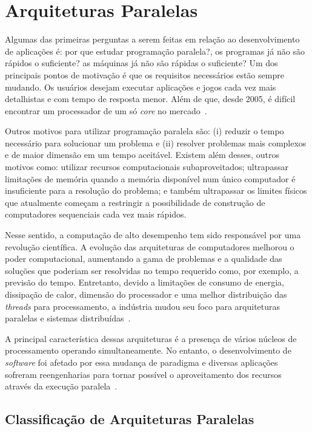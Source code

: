 \section{Arquiteturas Paralelas}\label{sec:arquitetura}

Algumas das primeiras perguntas a serem feitas em relação ao desenvolvimento de aplicações é: por que estudar programação paralela?, os programas já não são rápidos o suficiente? as máquinas já não são rápidas o suficiente? Um dos principais pontos de motivação é que os requisitos necessários estão sempre mudando. Os usuários desejam executar aplicações e jogos cada vez mais detalhistas e com tempo de resposta menor. Além de que, desde 2005, é difícil encontrar um processador de um só \textit{core} no mercado~\cite{fruehe2005multicore, gepner2006multi}.

Outros motivos para utilizar programação paralela são: (i) reduzir o tempo necessário para solucionar um problema e (ii) resolver problemas mais complexos e de maior dimensão em um tempo aceitável. Existem além desses, outros motivos como: utilizar recursos computacionais subaproveitados; ultrapassar limitações de memória quando a memória disponível num único computador é insuficiente para a resolução do problema; e também ultrapassar os limites físicos que atualmente começam a restringir a possibilidade de construção de computadores sequenciais cada vez mais rápidos.

Nesse sentido, a computação de alto desempenho tem sido responsável por uma revolução científica. A evolução das arquiteturas de computadores melhorou o poder computacional, aumentando a gama de problemas e a qualidade das soluções que poderiam ser resolvidas no tempo requerido como, por exemplo, a previsão do tempo. Entretanto, devido a limitações de consumo de energia, dissipação de calor, dimensão do processador e uma melhor distribuição das \textit{threads} para processamento, a indústria mudou seu foco para arquiteturas paralelas e sistemas distribuídas~\cite{hsu2015three,borkar2011future,coteus2011technologies}.

A principal característica dessas arquiteturas é a presença de vários núcleos de processamento operando simultaneamente. No entanto, o desenvolvimento de \textit{software} foi afetado por essa mudança de paradigma e diversas aplicações sofreram reengenharias para tornar possível o aproveitamento dos recursos através da execução paralela~\cite{Gropp2013,Mittal2015,Cruz2016}.

\subsection{Classificação de Arquiteturas Paralelas}

